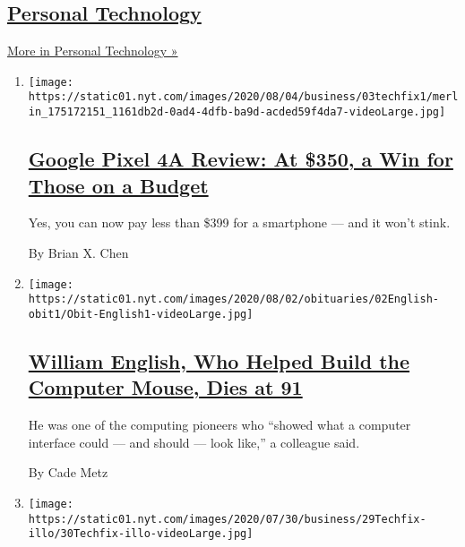 \hypertarget{personal-technology}{%
\subsection{\texorpdfstring{\href{/section/technology/personaltech}{Personal
Technology}}{Personal Technology}}\label{personal-technology}}

\href{/section/technology/personaltech}{More in Personal Technology »}

\begin{enumerate}
\def\labelenumi{\arabic{enumi}.}
\item
  \texttt{[image: https://static01.nyt.com/images/2020/08/04/business/03techfix1/merlin\_175172151\_1161db2d-0ad4-4dfb-ba9d-acded59f4da7-videoLarge.jpg]}

  \hypertarget{google-pixel-4a-review-at-350-a-win-for-those-on-a-budget}{%
  \subsection{\texorpdfstring{\href{/2020/08/03/technology/personaltech/google-pixel-4a-review.html}{Google
  Pixel 4A Review: At \$350, a Win for Those on a
  Budget}}{Google Pixel 4A Review: At \$350, a Win for Those on a Budget}}\label{google-pixel-4a-review-at-350-a-win-for-those-on-a-budget}}

  Yes, you can now pay less than \$399 for a smartphone --- and it won't
  stink.

  By Brian X. Chen
\item
  \texttt{[image: https://static01.nyt.com/images/2020/08/02/obituaries/02English-obit1/Obit-English1-videoLarge.jpg]}

  \hypertarget{william-english-who-helped-build-the-computer-mouse-dies-at-91}{%
  \subsection{\texorpdfstring{\href{/2020/07/31/technology/william-english-who-helped-build-the-computer-mouse-dies-at-91.html}{William
  English, Who Helped Build the Computer Mouse, Dies at
  91}}{William English, Who Helped Build the Computer Mouse, Dies at 91}}\label{william-english-who-helped-build-the-computer-mouse-dies-at-91}}

  He was one of the computing pioneers who ``showed what a computer
  interface could --- and should --- look like,'' a colleague said.

  By Cade Metz
\item
  \texttt{[image: https://static01.nyt.com/images/2020/07/30/business/29Techfix-illo/30Techfix-illo-videoLarge.jpg]}


\end{enumerate}
